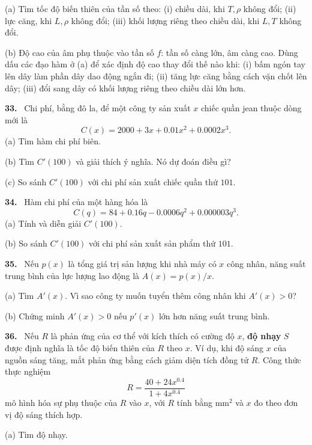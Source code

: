 \documentclass[12pt,a4paper]{article}
\newcommand{\bt}[1]{\par\smallskip\noindent\textbf{#1.}\ }
\begin{document}
(a) Tìm tốc độ biến thiên của tần số theo: (i) chiều dài, khi $T,\rho$ không đổi; (ii) lực căng, khi $L,\rho$ không đổi; (iii) khối lượng riêng theo chiều dài, khi $L,T$ không đổi.

(b) Độ cao của âm phụ thuộc vào tần số $f$: tần số càng lớn, âm càng cao. Dùng dấu các đạo hàm ở (a) để xác định độ cao thay đổi thế nào khi: (i) bấm ngón tay lên dây làm phần dây dao động ngắn đi; (ii) tăng lực căng bằng cách vặn chốt lên dây; (iii) đổi sang dây có khối lượng riêng theo chiều dài lớn hơn.
\bt{33} Chi phí, bằng đô la, để một công ty sản xuất $x$ chiếc quần jean thuộc dòng mới là
\[C(x)=2000+3x+0.01x^2+0.0002x^3.\]
(a) Tìm hàm chi phí biên.

(b) Tìm $C'(100)$ và giải thích ý nghĩa. Nó dự đoán điều gì?

(c) So sánh $C'(100)$ với chi phí sản xuất chiếc quần thứ $101$.
\bt{34} Hàm chi phí của một hàng hóa là
\[C(q)=84+0.16q-0.0006q^2+0.000003q^3.\]
(a) Tính và diễn giải $C'(100)$.

(b) So sánh $C'(100)$ với chi phí sản xuất sản phẩm thứ $101$.
\bt{35} Nếu $p(x)$ là tổng giá trị sản lượng khi nhà máy có $x$ công nhân, năng suất trung bình của lực lượng lao động là $A(x)=p(x)/x$.

(a) Tìm $A'(x)$. Vì sao công ty muốn tuyển thêm công nhân khi $A'(x)>0$?

(b) Chứng minh $A'(x)>0$ nếu $p'(x)$ lớn hơn năng suất trung bình.
\bt{36} Nếu $R$ là phản ứng của cơ thể với kích thích có cường độ $x$, \textbf{độ nhạy} $S$ được định nghĩa là tốc độ biến thiên của $R$ theo $x$. Ví dụ, khi độ sáng $x$ của nguồn sáng tăng, mắt phản ứng bằng cách giảm diện tích đồng tử $R$. Công thức thực nghiệm
\[R=\frac{40+24x^{0.4}}{1+4x^{0.4}}\]
mô hình hóa sự phụ thuộc của $R$ vào $x$, với $R$ tính bằng mm$^2$ và $x$ đo theo đơn vị độ sáng thích hợp.

(a) Tìm độ nhạy.
\end{document}
